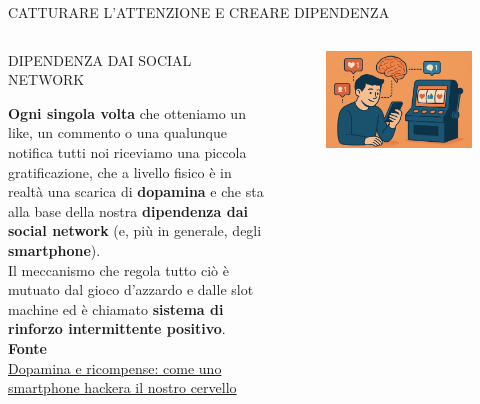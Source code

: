 \documentclass[aspectratio=1610]{beamer}
\begin{document}
\begin{frame}{CATTURARE L'ATTENZIONE E CREARE DIPENDENZA}
    \begin{columns}
            \begin{alertblock}{DIPENDENZA DAI SOCIAL NETWORK}
                \begin{minipage}{0.96\linewidth}
                    \justifying
                    \textbf{Ogni singola volta} che otteniamo un like, un commento o una qualunque notifica 
                    tutti noi riceviamo una piccola gratificazione, che a livello fisico è in realtà 
                    una scarica di \textbf{dopamina} e che sta alla base della nostra \textbf{dipendenza dai social 
                    network} (e, più in generale, degli \textbf{smartphone}).\\
                    Il meccanismo che regola tutto ciò è mutuato dal gioco d’azzardo e 
                    dalle slot machine ed è chiamato \textbf{sistema di rinforzo intermittente positivo}.\\
                    \bigskip
                    \tiny{\textbf{Fonte}}\\
                    \tiny{\href{https://www.wired.it/attualita/tech/2020/09/24/social-dilemma-dopamina-effetto-smartphone-cervello}{Dopamina e ricompense: come uno smartphone hackera il nostro cervello}}
                \end{minipage}
            \end{alertblock}
            \begin{figure}
                \includegraphics[width=\linewidth]{img/dopamina_1.png}

\end{figure}
\end{columns}
\end{frame}
\end{document}
